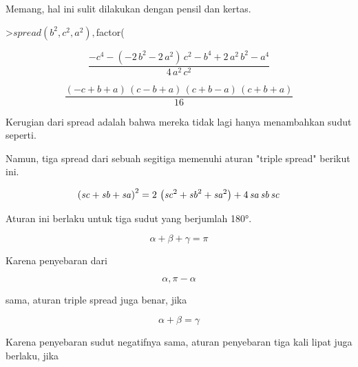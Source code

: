 \documentclass[12pt,arial,letterpaper]{book}
\begin{document}
\begin{eulernootebook}
\begin{eulercomment}
\begin{eulercomment}
\begin{eulernootebook}
\begin{eulercomment}
\begin{eulercomment}
\begin{eulercomment}
\begin{eulercomment}
\begin{eulercomment}
\begin{eulercomment}
\begin{eulernotebook}
\begin{eulercomment}
\begin{eulercomment}
\begin{eulercomment}
\begin{eulercomment}
\begin{eulercomment}
Memang, hal ini sulit dilakukan dengan pensil dan kertas.
\end{eulercomment}
\begin{eulerprompt}
>$spread(b^2,c^2,a^2), $factor(%
\end{eulerprompt}
\begin{eulerformula}
\[
\frac{-c^4-\left(-2\,b^2-2\,a^2\right)\,c^2-b^4+2\,a^2\,b^2-a^4}{4
 \,a^2\,c^2}
\]
\end{eulerformula}
\begin{eulerformula}
\[
\frac{\left(-c+b+a\right)\,\left(c-b+a\right)\,\left(c+b-a\right)\,
 \left(c+b+a\right)}{16}
\]
\end{eulerformula}
\begin{eulercomment}
Kerugian dari spread adalah bahwa mereka tidak lagi hanya menambahkan
sudut seperti.

Namun, tiga spread dari sebuah segitiga memenuhi aturan "triple
spread" berikut ini.
\end{eulercomment}
\begin{eulerformula}
\[
\left({\it sc}+{\it sb}+{\it sa}\right)^2=2\,\left({\it sc}^2+
 {\it sb}^2+{\it sa}^2\right)+4\,{\it sa}\,{\it sb}\,{\it sc}
\]
\end{eulerformula}
\begin{eulercomment}
Aturan ini berlaku untuk tiga sudut yang berjumlah 180°.

\end{eulercomment}
\begin{eulerformula}
\[
\alpha+\beta+\gamma=\pi
\]
\end{eulerformula}
\begin{eulercomment}
Karena penyebaran dari

\end{eulercomment}
\begin{eulerformula}
\[
\alpha, \pi-\alpha
\]
\end{eulerformula}
\begin{eulercomment}
sama, aturan triple spread juga benar, jika

\end{eulercomment}
\begin{eulerformula}
\[
\alpha+\beta=\gamma
\]
\end{eulerformula}
\begin{eulercomment}
Karena penyebaran sudut negatifnya sama, aturan penyebaran tiga kali
lipat juga berlaku, jika


\end{eulercomment}
\end{eulercomment}
\end{eulercomment}
\end{eulercomment}
\end{eulercomment}
\end{eulernotebook}
\end{eulercomment}
\end{eulercomment}
\end{eulercomment}
\end{eulercomment}
\end{eulercomment}
\end{eulercomment}
\end{eulernootebook}
\end{eulercomment}
\end{eulercomment}
\end{eulernootebook}
\end{document}
